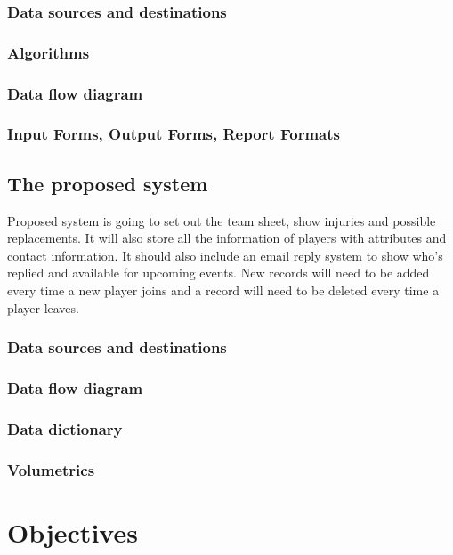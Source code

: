 \subsubsection{Data sources and destinations}

\subsubsection{Algorithms}

\subsubsection{Data flow diagram}

\subsubsection{Input Forms, Output Forms, Report Formats}

\subsection{The proposed system}
Proposed system is going to set out the team sheet, show injuries and possible replacements. It will also store all the information of players with attributes and contact information. It should also include an email reply system to show who's replied and available for upcoming events.  New records will need to be added every time a new player joins and a record will need to be deleted every time a player leaves.

\subsubsection{Data sources and destinations}

\subsubsection{Data flow diagram}

\subsubsection{Data dictionary}

\subsubsection{Volumetrics}

\section{Objectives}

